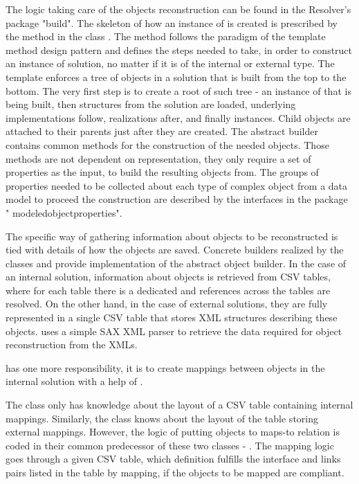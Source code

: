 The logic taking care of the objects reconstruction can be found in the Resolver's package "build".
The skeleton of how an instance of  is created is prescribed by the method  in the class . The method follows the paradigm of the template method design pattern and defines the steps needed to take, in order to construct an instance of  solution, no matter if it is of the internal or external type.
The template enforces a tree of objects in a solution that is built from the top to the bottom.
The very first step is to create a root of such tree - an instance of  that is being built, then  structures from the solution are loaded, underlying  implementations follow,  realizations after, and finally  instances. 
Child objects are attached to their parents just after they are created.
The abstract builder contains common methods for the construction of the needed objects. 
Those methods are not dependent on representation, they only require a set of properties as the input, to build the resulting objects from. 
The groups of properties needed to be collected about each type of complex object from a data model to proceed the construction are described by the interfaces in the package " modeledobjectproperties".

The specific way of gathering information about objects to be reconstructed is tied with details of how the objects are saved. 
Concrete builders realized by the classes  and  provide implementation of the abstract object builder.
In the case of an internal solution, information about objects is retrieved from CSV tables, where for each table there is a dedicated and references across the tables are resolved.
On the other hand, in the case of external solutions, they are fully represented in a single CSV table that stores XML structures describing these objects. 
 uses a simple SAX XML parser to retrieve the data required for object reconstruction from the XMLs.

 has one more responsibility, it is to create mappings between  objects in the internal solution with a help of . 

The  class only has knowledge about the layout of a CSV table containing internal mappings. Similarly, the  class knows about the layout of the table storing external mappings.
However, the logic of putting objects to maps-to relation is coded in their common predecessor of these two classes - .
The mapping logic goes through a given CSV table, which definition fulfills the interface  and links pairs listed in the table by mapping, if the objects to be mapped are compliant.

